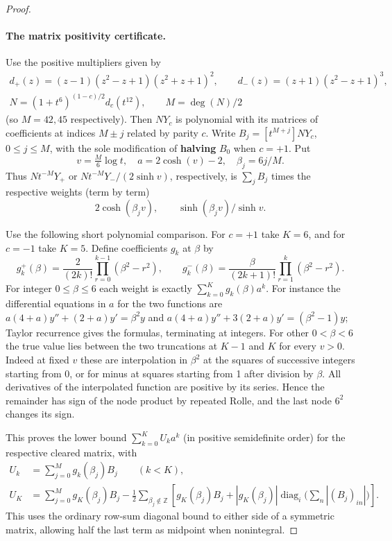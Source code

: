 \begin{proof}
\paragraph{The matrix positivity certificate.}
Use the positive multipliers given by
\[
 \begin{gathered}
 d_+(z)=(z-1)(z^2-z+1)(z^2+z+1)^2,\qquad
 d_-(z)=(z+1)(z^2-z+1)^3,\\
 N=(1+t^6)^{(1-c)/2}d_c(t^{12}),\qquad M=\deg(N)/2
 \end{gathered}
\]
(so \(M=42,45\) respectively). Then \(N Y_c\) is polynomial with its matrices of coefficients at indices \(M\pm j\) related by parity \(c\). Write \(B_j=[t^{M+j}]N Y_c\), \(0\le j\le M\), with the sole modification of \textbf{halving} \(B_0\) when \(c=+1\). Put
\[
 v=\tfrac{M}{6}\log t,\quad a=2\cosh(v)-2,\quad \beta_j=6j/M .
\]
Thus \(Nt^{-M}Y_+\) or \(Nt^{-M}Y_-/(2\sinh v)\), respectively, is \(\sum_j B_j\) times the respective weights (term by term)
\[
 2\cosh(\beta_j v),\qquad \sinh(\beta_j v)/\sinh v .
\]

Use the following short polynomial comparison. For \(c=+1\) take \(K=6\), and for \(c=-1\) take \(K=5\). Define coefficients \(g_k\) at \(\beta\) by
\[
 g_k^+(\beta)=\frac{2}{(2k)!}\prod_{r=0}^{k-1}(\beta^2-r^2),\qquad
 g_k^-(\beta)=\frac{\beta}{(2k+1)!}\prod_{r=1}^{k}(\beta^2-r^2).
\]
For integer \(0\le\beta\le6\) each weight is exactly \(\sum_{k=0}^K g_k(\beta)a^k\). For instance the differential equations in \(a\) for the two functions are \(a(4+a)y''+(2+a)y'=\beta^2 y\) and \(a(4+a)y''+3(2+a)y'=(\beta^2-1)y\); Taylor recurrence gives the formulas, terminating at integers. For other \(0<\beta<6\) the true value lies between the two truncations at \(K-1\) and \(K\) for every \(v>0\). Indeed at fixed \(v\) these are interpolation in \(\beta^2\) at the squares of successive integers starting from 0, or for minus at squares starting from 1 after division by \(\beta\). All derivatives of the interpolated function are positive by its series. Hence the remainder has sign of the node product by repeated Rolle, and the last node \(6^2\) changes its sign.

This proves the lower bound \(\sum_{k=0}^K U_k a^k\) (in positive semidefinite order) for the respective cleared matrix, with
\[
 \begin{split}
 U_k&=\sum_{j=0}^M g_k(\beta_j) B_j\qquad(k<K),\\
 U_K&=\sum_{j=0}^M g_K(\beta_j) B_j-
 \tfrac12\sum_{\beta_j\notin\mathbb Z}
 \left[g_K(\beta_j)B_j+|g_K(\beta_j)|\operatorname{diag}_i\Big(\sum_n |(B_j)_{in}|\Big)\right].
 \end{split}
\]
This uses the ordinary row-sum diagonal bound to either side of a symmetric matrix, allowing half the last term as midpoint when nonintegral.


\end{proof}
